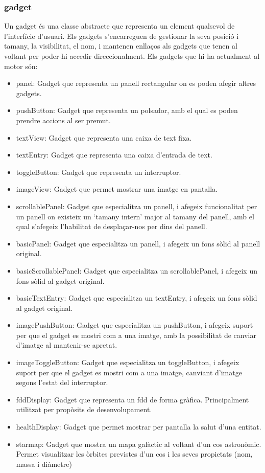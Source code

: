 \subsubsection{gadget}
Un gadget és una classe abstracte que representa un element qualsevol de l'interfície d'usuari. Els gadgets s'encarreguen de gestionar la seva posició i tamany, la visibilitat, el nom, i mantenen enllaços als gadgets que tenen al voltant per poder-hi accedir direccionalment.
Els gadgets que hi ha actualment al motor són:
\begin{itemize}
  \item{panel: Gadget que representa un panell rectangular on es poden afegir altres gadgets.}
  \item{pushButton: Gadget que representa un polsador, amb el qual es poden prendre accions al ser premut.}
  \item{textView: Gadget que representa una caixa de text fixa.}
  \item{textEntry: Gadget que representa una caixa d'entrada de text.}
  \item{toggleButton: Gadget que representa un interruptor.}
  \item{imageView: Gadget que permet mostrar una imatge en pantalla.}
  \item{scrollablePanel: Gadget que especialitza un panell, i afegeix funcionalitat per un panell on existeix un `tamany intern' major al tamany del panell, amb el qual s'afegeix l'habilitat de desplaçar-nos per dins del panell.}
  \item{basicPanel: Gadget que especialitza un panell, i afegeix un fons sòlid al panell original.}
  \item{basicScrollablePanel: Gadget que especialitza un scrollablePanel, i afegeix un fons sòlid al gadget original.}
  \item{basicTextEntry: Gadget que especialitza un textEntry, i afegeix un fons sòlid al gadget original.}
  \item{imagePushButton: Gadget que especialitza un pushButton, i afegeix suport per que el gadget es mostri com a una imatge, amb la possibilitat de canviar d'imatge al mantenir-se apretat.}
  \item{imageToggleButton: Gadget que especialitza un toggleButton, i afegeix suport per que el gadget es mostri com a una imatge, canviant d'imatge segons l'estat del interruptor.}
  \item{fddDisplay: Gadget que representa un fdd de forma gràfica. Principalment utilitzat per propòsits de desenvolupament.}
  \item{healthDisplay: Gadget que permet mostrar per pantalla la salut d'una entitat.}
  \item{starmap: Gadget que mostra un mapa galàctic al voltant d'un cos astronòmic. Permet visualitzar les òrbites previstes d'un cos i les seves propietats (nom, massa i diàmetre)}
\end{itemize}
